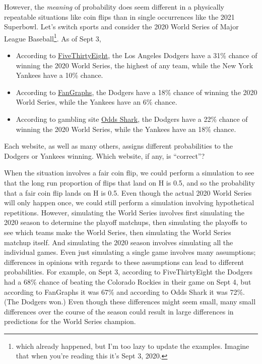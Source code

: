 \documentclass[
]{book}
\providecommand{\tightlist}{%
  \setlength{\itemsep}{0pt}\setlength{\parskip}{0pt}}
\theoremstyle{definition}
\theoremstyle{definition}
\theoremstyle{definition}
\theoremstyle{remark}
\begin{document}
However, the \emph{meaning} of probability does seem different in a physically repeatable situations like coin flips than in single occurrences like the 2021 Superbowl. Let's switch sports and consider the 2020 World Series of Major League Baseball\footnote{which already happened, but I'm too lazy to update the examples. Imagine that when you're reading this it's Sept 3, 2020.}. As of Sept 3,

\begin{itemize}
\tightlist
\item
  According to \href{https://projects.fivethirtyeight.com/2020-mlb-predictions/1/34}{FiveThirtyEight}, the Los Angeles Dodgers have a 31\% chance of winning the 2020 World Series, the highest of any team, while the New York Yankees have a 10\% chance.
\item
  According to \href{https://www.fangraphs.com/standings/playoff-odds/fg/mlb?date=2020-09-03\&dateDelta=}{FanGraphs}, the Dodgers have a 18\% chance of winning the 2020 World Series, while the Yankees have an 6\% chance.
\item
  According to gambling site \href{https://www.oddsshark.com/mlb/world-series-odds}{Odds Shark}, the Dodgers have a 22\% chance of winning the 2020 World Series, while the Yankees have an 18\% chance.
\end{itemize}

Each website, as well as many others, assigns different probabilities to the Dodgers or Yankees winning. Which website, if any, is ``correct''?

When the situation involves a fair coin flip, we could perform a simulation to see that the long run proportion of flips that land on H is 0.5, and so the probability that a fair coin flip lands on H is 0.5. Even though the actual 2020 World Series will only happen once, we could still perform a simulation involving hypothetical repetitions. However, simulating the World Series involves first simulating the 2020 season to determine the playoff matchups, then simulating the playoffs to see which teams make the World Series, then simulating the World Series matchup itself. And simulating the 2020 season involves simulating all the individual games. Even just simulating a single game involves many assumptions; differences in opinions with regards to these assumptions can lead to different probabilities. For example, on Sept 3, according to FiveThirtyEight the Dodgers had a 68\% chance of beating the Colorado Rockies in their game on Sept 4, but according to FanGraphs it was 67\% and according to Odds Shark it was 72\%. (The Dodgers won.) Even though these differences might seem small, many small differences over the course of the season could result in large differences in predictions for the World Series champion.
\end{document}
